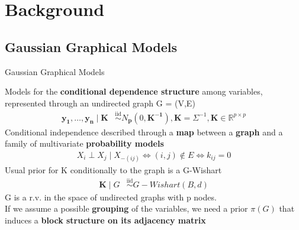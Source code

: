 

\section{Background}

\subsection{Gaussian Graphical Models}
\begin{frame}{Gaussian Graphical Models}
\newcommand{\iid}{\overset{\mathrm{iid}}{\sim}}
\newcommand{\ind}{\overset{\mathrm{ind}}{\sim}}

    Models for the \textbf{conditional dependence structure} among variables, represented through an undirected graph G = (V,E)
    \begin{align*}
    \mathbf{y_{1}}, \ldots, \mathbf{y_{n}} \mid \mathbf{K} &\iid N_\mathbf{{p}}(0,\mathbf{K^{-1}}), \mathbf{K}=\Sigma^{-1}, \mathbf{K} \in \mathbb{R}^{p\times p}  %
    \end{align*}
Conditional independence described through a \textbf{map} between a \textbf{graph} and a family of multivariate \textbf{probability models}
\begin{align*}
X_{i}\perp X_{j} \mid X_{-(ij)}\Leftrightarrow (i,j) \notin E \Leftrightarrow k_{ij}=0
\end{align*}
Usual prior for K conditionally to the graph is a G-Wishart
\centering
\begin{align*}
    \mathbf{K} \mid G &\iid G-Wishart(B,d)
\end{align*}
G is a r.v. in the space of undirected graphs with p nodes.\\
If we assume a possible \textbf{grouping} of the variables, we need a prior $\pi(G)$ that induces a \textbf{block structure on its adjacency matrix}
\end{frame}




